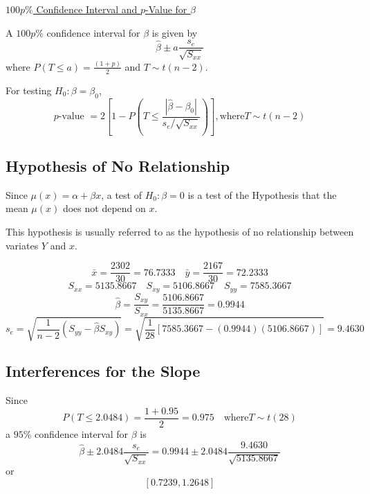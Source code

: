 \underline{$ 100p\% $ Confidence Interval and $ p $-Value for $ \beta $}

A $ 100p\% $ confidence interval for $ \beta $ is given by
\[\hat{\beta} \pm a \frac{s_{e}}{\sqrt{S_{x x}}}\]
where $ P(T\leqslant a)=\frac{(1+p)}{2} $ and $ T\sim t(n-2) $.

For testing $ H_0: \beta=\beta_0 $,
\[p \text{-value }=2\left[1-P\left(T \leq \frac{\left|\hat{\beta}-\beta_{0}\right|}{s_{e} / \sqrt{S_{x x}}}\right)\right], \text{where} T \sim t(n-2)\]

\subsection{Hypothesis of No Relationship}
Since $ \mu(x)=\alpha+\beta x $, a test of $ H_0: \beta=0 $ is a test of the Hypothesis
that the mean $ \mu(x) $ does not depend on $ x $.

This hypothesis is usually referred to as the hypothesis of no relationship
between variates $ Y $ and $ x $.

\begin{exbox}
    \begin{example}
        \[\bar{x}=\frac{2302}{30}=76.7333 \quad \bar{y}=\frac{2167}{30}=72.2333\]
        \[S_{x x}=5135.8667 \quad S_{x y}=5106.8667 \quad S_{y y}=7585.3667\]
        \[\hat{\beta}=\frac{S_{x y}}{S_{x x}}=\frac{5106.8667}{5135.8667}=0.9944\]
        \[s_{e}=\sqrt{\frac{1}{n-2}\left(S_{y y}-\hat{\beta} S_{x y}\right)}
            =\sqrt{\frac{1}{28}[7585.3667-(0.9944)(5106.8667)]}=9.4630\]
    \end{example}
\end{exbox}

\subsection{Interferences for the Slope}
\begin{exbox}
    \begin{example}
        Since
        \[P(T \leq 2.0484)=\frac{1+0.95}{2}=0.975 \quad \text{where} T \sim t(28)\]
        a $ 95\% $ confidence interval for $ \beta $ is
        \[\hat{\beta} \pm 2.0484 \frac{s_{e}}{\sqrt{S_{x x}}}
            =0.9944 \pm 2.0484 \frac{9.4630}{\sqrt{5135.8667}}\]
        or
        \[ \left[ 0.7239,1.2648 \right] \]
    \end{example}
\end{exbox}

